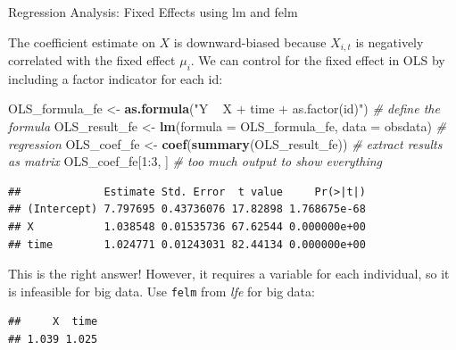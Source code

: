 \documentclass[10pt,ignorenonframetext,]{beamer}
\newenvironment{Shaded}{\begin{snugshade}}{\end{snugshade}}
\newcommand{\KeywordTok}[1]{\textcolor[rgb]{0.13,0.29,0.53}{\textbf{{#1}}}}
\newcommand{\DataTypeTok}[1]{\textcolor[rgb]{0.13,0.29,0.53}{{#1}}}
\newcommand{\DecValTok}[1]{\textcolor[rgb]{0.00,0.00,0.81}{{#1}}}
\newcommand{\StringTok}[1]{\textcolor[rgb]{0.31,0.60,0.02}{{#1}}}
\newcommand{\CommentTok}[1]{\textcolor[rgb]{0.56,0.35,0.01}{\textit{{#1}}}}
\newcommand{\NormalTok}[1]{{#1}}
\begin{document}
\begin{frame}[fragile]{Regression Analysis: Fixed Effects using lm and
felm}

The coefficient estimate on \(X\) is downward-biased because \(X_{i,t}\)
is negatively correlated with the fixed effect \(\mu_i\). We can control
for the fixed effect in OLS by including a factor indicator for each id:

\footnotesize

\begin{Shaded}
\begin{Highlighting}[]
\NormalTok{OLS_formula_fe <-}\StringTok{ }\KeywordTok{as.formula}\NormalTok{(}\StringTok{"Y ~ X + time + as.factor(id)"}\NormalTok{) }\CommentTok{# define the formula}
\NormalTok{OLS_result_fe <-}\StringTok{ }\KeywordTok{lm}\NormalTok{(}\DataTypeTok{formula =} \NormalTok{OLS_formula_fe, }\DataTypeTok{data =} \NormalTok{obsdata) }\CommentTok{# regression}
\NormalTok{OLS_coef_fe <-}\StringTok{ }\KeywordTok{coef}\NormalTok{(}\KeywordTok{summary}\NormalTok{(OLS_result_fe)) }\CommentTok{# extract results as matrix}
\NormalTok{OLS_coef_fe[}\DecValTok{1}\NormalTok{:}\DecValTok{3}\NormalTok{, ] }\CommentTok{# too much output to show everything}
\end{Highlighting}
\end{Shaded}

\begin{verbatim}
##             Estimate Std. Error  t value     Pr(>|t|)
## (Intercept) 7.797695 0.43736076 17.82898 1.768675e-68
## X           1.038548 0.01535736 67.62544 0.000000e+00
## time        1.024771 0.01243031 82.44134 0.000000e+00
\end{verbatim}

\normalsize

This is the right answer! However, it requires a variable for each
individual, so it is infeasible for big data. Use \texttt{felm} from
\emph{lfe} for big data:

\footnotesize

\begin{Shaded}
\end{Shaded}

\begin{verbatim}
##     X  time 
## 1.039 1.025
\end{verbatim}

\normalsize

\end{frame}
\end{document}
